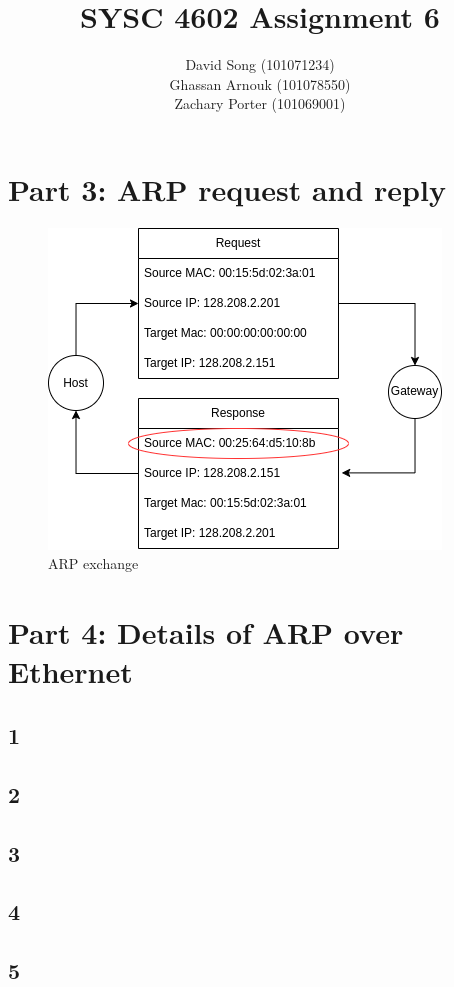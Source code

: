 \documentclass{article}
\begin{document}
    \title  { \textbf{SYSC 4602 Assignment 6} }
    \author {
        David Song (101071234)\\
        Ghassan Arnouk (101078550)\\
        Zachary Porter (101069001)
    }

    \maketitle

    \clearpage
    \section*{Part 3: ARP request and reply}
    \begin{figure}[htbp]
        \centering
        \includegraphics[width=\textwidth]{images/part3.drawio.png}
        \caption{ARP exchange}
    \end{figure}
    \clearpage
    \section*{Part 4: Details of ARP over Ethernet}
    \subsection*{1}
    \subsection*{2}
    \subsection*{3}
    \subsection*{4}
    \subsection*{5}
\end{document}
